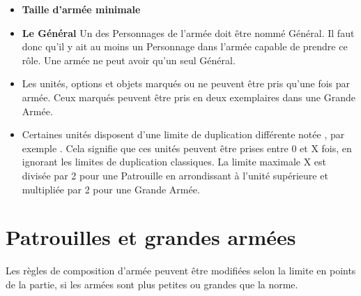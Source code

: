 \begin{itemize}[label={\textbullet}]
\item \textbf{Taille d'armée minimale}\newline
{}
\item \textbf{Le Général}\newline
Un des Personnages de l'armée doit être nommé Général. Il faut donc qu'il y ait au moins un Personnage dans l'armée capable de prendre ce rôle. Une armée ne peut avoir qu'un seul Général.
\item \textbf{}\newline
Les unités, options et objets marqués \oneofakind{} ou \oneperarmy{} ne peuvent être pris qu'une fois par armée. Ceux marqués \oneofakind{} peuvent être pris en deux exemplaires dans une Grande Armée.
\item \textbf{}\newline
Certaines unités disposent d'une limite de duplication différente notée , par exemple . Cela signifie que ces unités peuvent être prises entre 0 et X fois, en ignorant les limites de duplication classiques. La limite maximale X est divisée par 2 pour une Patrouille en arrondissant à l'unité supérieure et multipliée par 2 pour une Grande Armée.
\end{itemize}

\newpage
\section{Patrouilles et grandes armées}

Les règles de composition d'armée peuvent être modifiées selon la limite en points de la partie, si les armées sont plus petites ou grandes que la norme.

